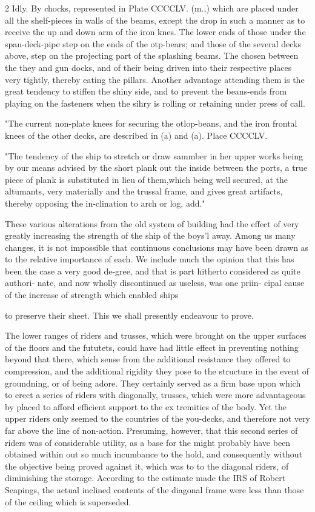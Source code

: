 \documentclass{article}
\begin{document}
2 Idly. By chocks, represented in Plate CCCCLV. (m.,) which are placed under all the shelf-pieces in walls of the beams, except the drop in such a manner as to receive the up and down arm of the iron knes. The lower ends of those under the span-deck-pipe step on the ends of the otp-bears; and those of the several decks above, step on the projecting part of the splashing beams. The chosen between the they and gun docks, and of their being driven into their respective places very tightly, thereby eating the pillars. Another advantage attending them is the great tendency to stiffen the shiny side, and to prevent the beans-ends from playing on the fasteners when the sihry is rolling or retaining under press of call.

"The current non-plate knees for securing the otlop-beans, and the iron frontal knees of the other decks, are described in (a) and (a). Place CCCCLV.

"The tendency of the ship to stretch or draw sammber in her upper works being by our means advised by the short plank out the inside between the ports, a true piece of plank is substituted in lieu of them,which being well secured, at the altumants, very materially and the trussal frame, and gives great artifacts, thereby opposing the in-clination to arch or log, add."

These various alterations from the old system of building had the effect of very greatly increasing the strength of the ship of the boys'l away. Among us many changes, it is not impossible that continuous conclusions may have been drawn as to the relative importance of each. We include much the opinion that this has been the case a very good de-gree, and that is part hitherto considered as quite authori- nate, and now wholly discontinued as useless, was one priin- cipal cause of the increase of strength which enabled ships

to preserve their sheet. This we shall presently endeavour to prove.

The lower ranges of riders and trusses, which were brought on the upper surfaces of the floors and the fututets, could have had little effect in preventing nothing beyond that there, which sense from the additional resistance they offered to compression, and the additional rigidity they pose to the structure in the event of groundning, or of being adore. They certainly served as a firm base upon which to erect a series of riders with diagonally, trusses, which were more advantageous by placed to afford efficient support to the ex tremities of the body. Yet the upper riders only seemed to the countries of the you-decks, and therefore not very far above the line of non-action. Presuming, however, that this second series of riders was of considerable utility, as a base for the might probably have been obtained within out so much incumbance to the hold, and consequently without the objective being proved against it, which was to to the diagonal riders, of diminishing the storage. According to the estimate made the IRS of Robert Seapings, the actual inclined contents of the diagonal frame were less than those of the ceiling which is superseded.
\end{document}
